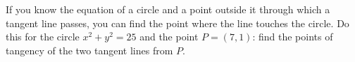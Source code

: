 If you know the equation of a circle and a point outside it through which a tangent line passes, you can find the point where the line touches the circle. Do this for the circle $x^2+y^2=25$ and the point $P=(7,1)$: find the points of tangency of the two tangent lines from $P$.
